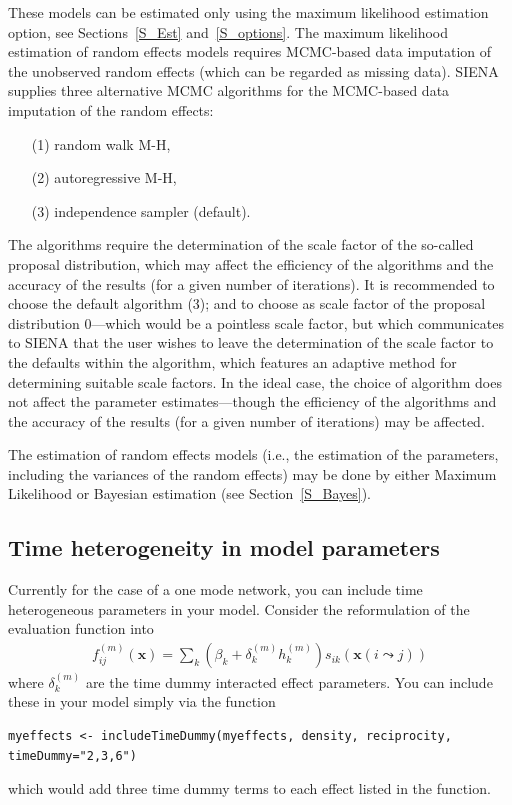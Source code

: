 \documentclass[a4paper,fleqn]{article}
\newcommand{\+}{\, + \,}
\newcommand{\SI}{{\sf SIENA }}
\begin{document}
{These models can be estimated only using the maximum likelihood
estimation option, see Sections~\ref{S_Est} and~\ref{S_options}.
The maximum likelihood estimation of random effects models requires MCMC-based data
imputation of the unobserved random effects (which can be regarded as missing data).
\SI supplies three alternative MCMC algorithms for the MCMC-based
data imputation of the random effects:
\begin{itemize}
\item[(1)] random walk M-H,
\item[(2)] autoregressive M-H,
\item[(3)] independence sampler (default).
\end{itemize}
The algorithms require the determination of the scale factor of the so-called proposal distribution,
which may affect the efficiency of the algorithms and
the accuracy of the results (for a given number of iterations).
It is recommended to choose the default algorithm (3);
and to choose as scale factor of the proposal distribution $0$---which
would be a pointless scale factor, but which communicates to \SI
that the user wishes to leave the determination of the scale factor to
the defaults within the algorithm,
which features an adaptive method for determining suitable scale factors.
In the ideal case, the choice of algorithm does not affect the
parameter estimates---though the efficiency of
the algorithms and the accuracy of the results (for a given number of iterations) may be affected.

The estimation of random effects models (i.e., the estimation of the parameters,
including the variances of the random effects) may be done by either Maximum Likelihood
or Bayesian estimation (see Section~\ref{S_Bayes}).

\fi

\subsection{Time heterogeneity in model parameters}
Currently for the case of a one mode network, you can include
time heterogeneous parameters in your model. Consider the reformulation of
the evaluation function into
\begin{align}
f^{(m)}_{ij}(\mathbf{x})= \sum_k (\beta_k + \delta_k^{(m)} h_k^{(m)}) s_{ik}(\mathbf{x}(i \leadsto j))
\label{eq:fmij}
\end{align}
where $\delta_k^{(m)}$ are the time dummy interacted effect parameters. You
can include these in your model simply via the function
\begin{verbatim}
myeffects <- includeTimeDummy(myeffects, density, reciprocity, timeDummy="2,3,6")
\end{verbatim}
which would add three time dummy terms to each effect listed in the function.

}
\end{document}
